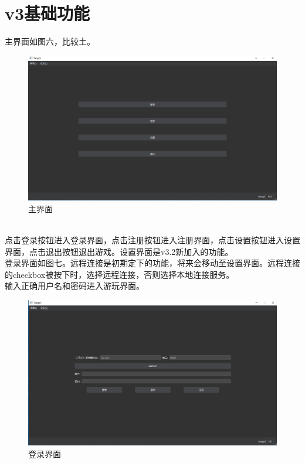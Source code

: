 \documentclass[UTF8]{ctexart}
\begin{document}
\section{v3基础功能}
主界面如图六，比较土。\\
\begin{figure}[h]
    \centering
    \includegraphics[scale=0.3]{./images/main_view.png}
    \caption{主界面}
\end{figure}\\
\indent 点击登录按钮进入登录界面，点击注册按钮进入注册界面，点击设置按钮进入设置界面，点击退出按钮退出游戏。设置界面是v3.2新加入的功能。\\
\indent 登录界面如图七。远程连接是初期定下的功能，将来会移动至设置界面。远程连接的checkbox被按下时，选择远程连接，否则选择本地连接服务。\\
\indent 输入正确用户名和密码进入游玩界面。\\
\begin{figure}[!ht]
    \centering
    \includegraphics[scale=0.3]{./images/login_view.png}
    \caption{登录界面}
\end{figure}\\
\end{document}
